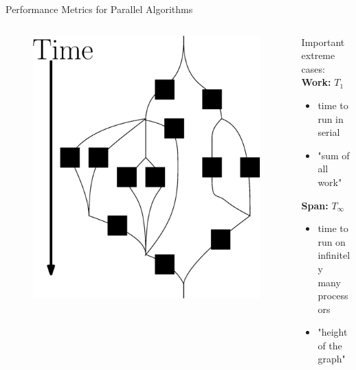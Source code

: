 \documentclass[table,serif,mathserif,final]{beamer}
\theoremstyle{remark}
\begin{document}
\begin{frame}{}
\begin{columns}[t]
\begin{column}{0.21\linewidth}
\begin{block}{\Huge Performance Metrics for Parallel Algorithms}
  \Huge
  \begin{columns}[T]
    \begin{column}{0.5\linewidth}
    \begin{figure}
      \includegraphics[width=0.8\linewidth]{imgs/parallelForLoop/altParallelForLoopComposition.eps}
    \end{figure}
    \end{column}
    \hfill
    \begin{column}{0.5\linewidth}
    Important extreme cases:\\
    \vspace{0.3cm}
    \textbf{Work:} $T_1$
    \begin{itemize}
      \item time to run in serial
      \item "sum of all work"
    \end{itemize}
    \vspace{0.3cm}
    \textbf{Span:} $T_\infty$
    \begin{itemize}
      \item time to run on infinitely \\many processors
      \item "height of the graph"
    \end{itemize}	
    \end{column}
\end{columns}
\end{block}
\vspace{0.5cm}


\end{column}
\end{columns}
\end{frame}
\end{document}
